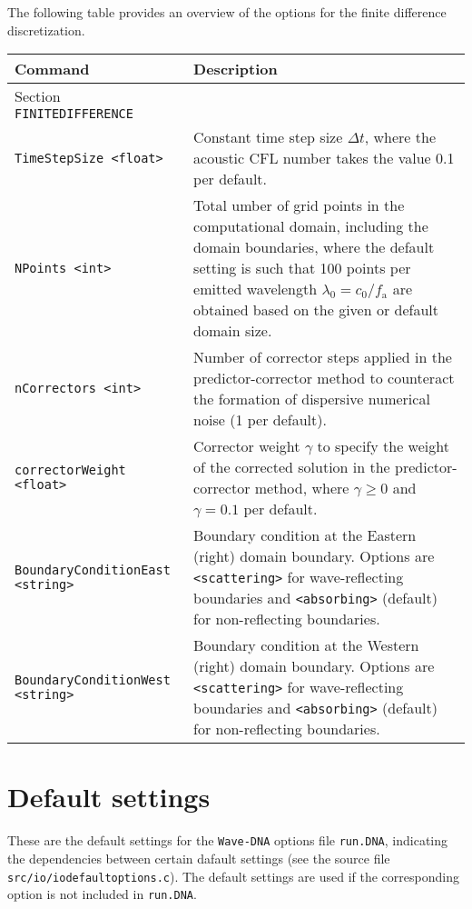 The following table provides an overview of the options for the finite difference discretization.

\noindent
\begin{longtable}{p{} p{}}
\textbf{Command} & \textbf{Description}
\vspace{1mm} \\
\hline Section {\tt FINITEDIFFERENCE} &\\ \hline
{\tt TimeStepSize <float>} & Constant time step size $\Delta t$, where the acoustic $\mathrm{CFL}$ number takes the value 0.1 per default. \\
{\tt NPoints <int>} & Total umber of grid points in the computational domain, including the domain boundaries, where the default setting is such that 100 points per emitted wavelength $\lambda_0 = c_0/f_{\mathrm{a}}$ are obtained based on the given or default domain size. \\
{\tt nCorrectors <int>} & Number of corrector steps applied in the predictor-corrector method to counteract the formation of dispersive numerical noise (1 per default). \\
{\tt correctorWeight <float>} & Corrector weight $\gamma$ to specify the weight of the corrected solution in the predictor-corrector method, where $\gamma\ge0$ and $\gamma=0.1$ per default.\\
{\tt BoundaryConditionEast <string>} & Boundary condition at the Eastern (right) domain boundary. Options are {\tt <scattering>} for wave-reflecting boundaries and {\tt <absorbing>} (default) for non-reflecting boundaries. \\
{\tt BoundaryConditionWest <string>} & Boundary condition at the Western (right) domain boundary. Options are {\tt <scattering>} for wave-reflecting boundaries and {\tt <absorbing>} (default) for non-reflecting boundaries. \\
\hline
\end{longtable} \vspace{1em}




\section{Default settings}
\label{sec:Default settings}

These are the default settings for the {\tt Wave-DNA} options file {\tt run.DNA}, indicating the dependencies between certain dafault settings (see the source file {\tt src/io/iodefaultoptions.c}). The default settings are used if the corresponding option is not included in {\tt run.DNA}.

